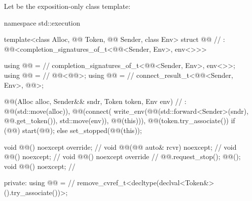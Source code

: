 \pnum
Let  be the exposition-only class template:

%
\begin{codeblock}
namespace std::execution {
  template<class Alloc, @@ Token, @@ Sender, class Env>
  struct @@                                                 // \expos
    : @@<completion_signatures_of_t<@@<Sender, Env>,
                                                         env<>>> {
    using @@ =                                                          // \expos
      completion_signatures_of_t<@@<Sender, Env>, env<>>;
    using @@ =                                                      // \expos
      @@<@@>;
    using @@ =                                                            // \expos
      connect_result_t<@@<Sender, Env>, @@>;

    @@(Alloc alloc, Sender&& sndr, Token token, Env env)    // \expos
      : @@(std::move(alloc)),
        @@(connect(
          write_env(@@(std::forward<Sender>(sndr), @@.get_token()), std::move(env)),
          @@(this))),
        @@(token.try_associate()) {
          if (@@)
            start(@@);
          else
            set_stopped(@@(this));
        }

    void @@() noexcept override;                                      // \expos
    void @@(@@ auto& rcvr) noexcept;                             // \expos
    void @@() noexcept;                                                // \expos
    void @@() noexcept override {                                   // \expos
      @@.request_stop();
      @@();
    }
    void @@() noexcept;                                        // \expos

  private:
    using @@ =                                                         // \expos
      remove_cvref_t<decltype(declval<Token&>().try_associate())>;

}}
\end{codeblock}
